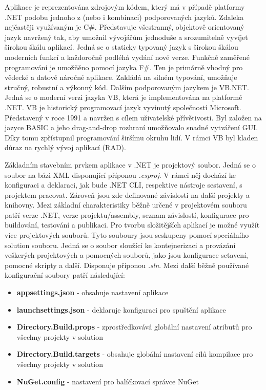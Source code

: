 Aplikace je reprezentována zdrojovým kódem, který má v případě platformy .NET podobu jednoho z (nebo i kombinaci) podporovaných jazyků. Zdaleka nejčastěji využívaným je C\#. Představuje všestranný, objektově orientovaný jazyk navržený tak, aby umožnil vývojářům jednoduše a srozumitelně vyvíjet širokou škálu aplikací. \cite{Price2023c8} Jedná se o staticky typovaný jazyk s širokou škálou moderních funkcí a každoročně podléhá vydání nové verze. Funkčně zaměřené programování je umožňěno pomocí jazyka F\#. Ten je primárně vhodný pro vědecké a datově náročné aplikace. \cite{Price2023c8} Zakládá na silném typování, umožňuje stručný, robustní a výkonný kód. Dalším podporovaným jazykem je VB.NET. Jedná se o moderní verzi jazyka VB, která je implementována na platformě .NET. VB je historický programovací jazyk vyvinutý společností Microsoft. Představený v roce 1991 a navržen s cílem uživatelské přívětivosti. Byl založen na jazyce BASIC a jeho drag-and-drop rozhraní umožňovalo snadné vytváření GUI. Díky tomu zpřístupnil programování širšímu okruhu lidí. V rámci VB byl kladen důraz na rychlý vývoj aplikací (RAD).


Základním stavebním prvkem aplikace v .NET je projektový soubor. Jedná se o soubor na bázi XML disponující příponou \emph{.csproj}. V rámci něj dochází ke konfiguraci a deklaraci, jak bude .NET CLI, respektive nástroje sestavení, s projektem pracovat. Zároveň jsou zde definované závislosti na další projekty a knihovny. \cite{Alls2023} Mezi základní charakteristiky běžně určené v projektovém souboru patří verze .NET, verze projektu/assembly, seznam závislostí, konfigurace pro buildování, testování a publikaci. Pro tvorbu složitějších aplikací je možné využít více projektových souborů. Tyto souboury jsou seskupeny pomocí speciálního solution souboru. Jedná se o soubor sloužící ke kontejnerizaci a provázání veškerých projektových a pomocných souborů, jako jsou konfigurace setavení, pomocné skripty a další. Disponuje příponou \emph{.sln}. Mezi další běžně používané konfigurační soubory patří následující:

\begin{itemize}
    \item \textbf{appsettings.json} - obsahuje nastavení aplikace
    \item \textbf{launchsettings.json} - deklaruje konfiguraci pro spuštění aplikace
    \item \textbf{Directory.Build.props} - zprostředkovává globální nastavení atributů pro všechny projekty v solution
    \item \textbf{Directory.Build.targets} - obsahuje globální nastavení cílů kompilace pro všechny projekty v solution
    \item \textbf{NuGet.config} - nastavení pro balíčkovací správce NuGet
\end{itemize}


